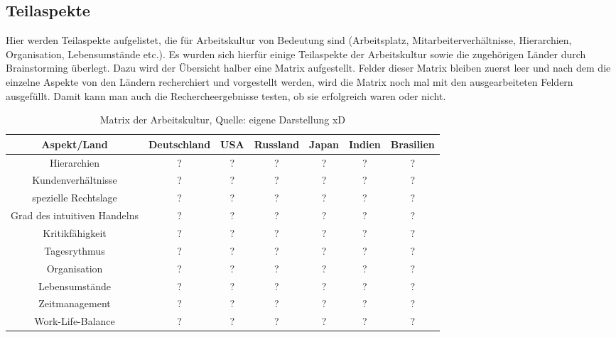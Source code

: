 \subsection{Teilaspekte}
	Hier werden Teilaspekte aufgelistet, die für Arbeitskultur von Bedeutung sind (Arbeitsplatz, Mitarbeiterverhältnisse, Hierarchien, Organisation, Lebensumstände etc.).
	Es wurden sich hierfür einige Teilaspekte der Arbeitskultur sowie die zugehörigen Länder durch Brainstorming überlegt. Dazu wird der Übersicht halber eine Matrix aufgestellt. Felder dieser Matrix bleiben zuerst leer und nach dem die einzelne Aspekte von den Ländern recherchiert und vorgestellt werden, wird die Matrix noch mal mit den ausgearbeiteten Feldern ausgefüllt. Damit kann man auch die Rechercheergebnisse testen, ob sie erfolgreich waren oder nicht.\\

\begin{table}[htp]
\begin{tabular}{|c|c|c|c|c|c|c|}
\hline  Aspekt/Land& Deutschland & USA & Russland & Japan & Indien & Brasilien \\ 
\hline 	Hierarchien  & ? & ? & ? & ? & ? & ? \\ 
\hline  Kundenverhältnisse& ? & ? & ? & ? & ? & ? \\ 
\hline  spezielle Rechtslage& ? & ? & ? & ? & ? & ? \\ 
\hline  Grad des intuitiven Handelns& ? & ? & ? & ? & ? & ? \\ 
\hline  Kritikfähigkeit& ? & ? & ? & ? & ? & ? \\ 
\hline  Tagesrythmus& ? & ? & ? & ? & ? & ? \\ 
\hline  Organisation& ? & ? & ? & ? & ? & ? \\ 
\hline  Lebensumstände& ? & ? & ? & ? & ? & ? \\ 
\hline  Zeitmanagement& ? & ? & ? & ? & ? & ? \\ 
\hline  Work-Life-Balance& ? & ? & ? & ? & ? & ? \\ 
\hline 
\end{tabular} 
\caption{Matrix der Arbeitskultur, Quelle: eigene Darstellung xD}
\end{table}
\newpage
